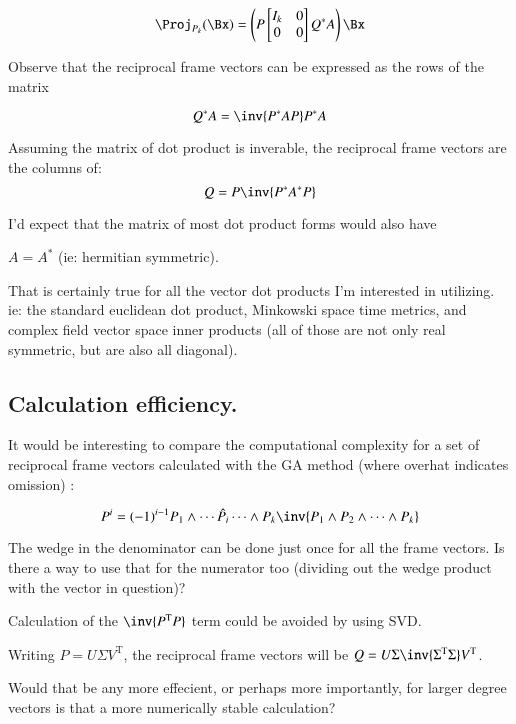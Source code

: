 \documentclass{article}      %
\newcommand{\T}[0]{\text{T}}
\begin{document}
\begin{equation}
\Proj_{P_k}(\Bx) =
\left(P
\begin{bmatrix}
I_k & 0 \\
0   & 0 \\
\end{bmatrix}
Q^* A\right) \Bx
\end{equation}

Observe that the reciprocal frame vectors can be expressed as the rows of the matrix

\begin{equation*}
Q^* A = \inv{P^* A P} P^* A
\end{equation*}

Assuming the matrix of dot product is inverable, the reciprocal frame vectors are the columns of:
\begin{equation}
Q = P \inv{P^* A^* P}
\end{equation}

I'd expect that the matrix of most dot product forms would also have 

$A = A^*$ (ie: hermitian symmetric).

That is certainly true for all the vector dot products
I'm interested in utilizing. ie: the standard euclidean dot product, Minkowski space time metrics,
and complex field vector space inner products (all of those are not only real symmetric, but are also
all diagonal).

\subsection{ Calculation efficiency. }

It would be interesting to compare the computational complexity for a set of reciprocal frame vectors calculated with the GA method (where overhat indicates omission) :

\[
P^i = (-1)^{i-1} P_1 \wedge \cdots \hat{P_i} \cdots \wedge P_k \inv { P_1 \wedge P_2 \wedge \cdots \wedge P_k }
\]

The wedge in the denominator can be done just once for all the frame vectors.  Is there a way to use that for the numerator too (dividing out the wedge product with the vector in question)?

Calculation of the $\inv{P^\T P}$ term could be avoided by using SVD.

Writing $P = U \Sigma V^\T$, the reciprocal frame vectors will be $Q = U \Sigma \inv{\Sigma^\T \Sigma} V^\T$.

Would that be any more effecient, or perhaps more importantly, for larger degree vectors is that a more numerically stable calculation?
\end{document}
